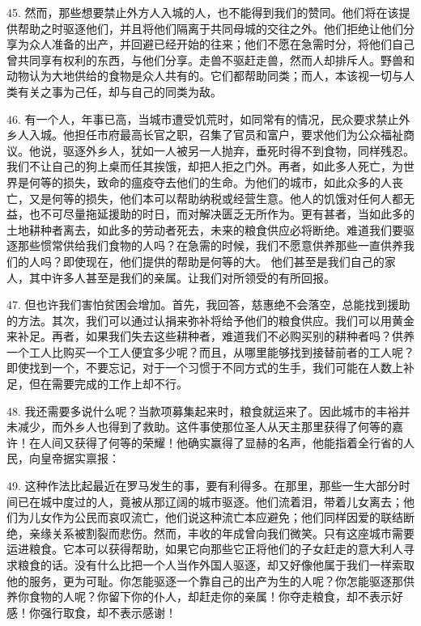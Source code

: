 \par

45. 然而，那些想要禁止外方人入城的人，也不能得到我们的赞同。他们将在该提供帮助之时驱逐他们，并且将他们隔离于共同母城的交往之外。他们拒绝让他们分享为众人准备的出产，并回避已经开始的往来；他们不愿在急需时分，将他们自己曾共同享有权利的东西，与他们分享。走兽不驱赶走兽，然而人却排斥人。野兽和动物认为大地供给的食物是众人共有的。它们都帮助同类；而人，本该视一切与人类有关之事为己任，却与自己的同类为敌。\par

46. 有一个人，年事已高，当城市遭受饥荒时，如同常有的情况，民众要求禁止外乡人入城。他担任市府最高长官之职，召集了官员和富户，要求他们为公众福祉商议。他说，驱逐外乡人，犹如一人被另一人抛弃，垂死时得不到食物，同样残忍。我们不让自己的狗上桌而任其挨饿，却把人拒之门外。再者，如此多人死亡，为世界是何等的损失，致命的瘟疫夺去他们的生命。为他们的城市，如此众多的人丧亡，又是何等的损失，他们本可以帮助纳税或经营生意。他人的饥饿对任何人都无益，也不可尽量拖延援助的时日，而对解决匮乏无所作为。更有甚者，当如此多的土地耕种者离去，如此多的劳动者死去，未来的粮食供应必将断绝。难道我们要驱逐那些惯常供给我们食物的人吗？在急需的时候，我们不愿意供养那些一直供养我们的人吗？即使现在，他们提供的帮助是何等的大。 他们甚至是我们自己的家人，其中许多人甚至是我们的亲属。让我们对所领受的有所回报。\par

47. 但也许我们害怕贫困会增加。首先，我回答，慈惠绝不会落空，总能找到援助的方法。其次，我们可以通过认捐来弥补将给予他们的粮食供应。我们可以用黄金来补足。再者，如果我们失去这些耕种者，难道我们不必购买别的耕种者吗？供养一个工人比购买一个工人便宜多少呢？而且，从哪里能够找到接替前者的工人呢？即使找到一个，不要忘记，对于一个习惯于不同方式的生手，我们可能在人数上补足，但在需要完成的工作上却不行。\par

48. 我还需要多说什么呢？当款项募集起来时，粮食就运来了。因此城市的丰裕并未减少，而外乡人也得到了救助。这件事使那位圣人从天主那里获得了何等的嘉许！在人间又获得了何等的荣耀！他确实赢得了显赫的名声，他能指着全行省的人民，向皇帝据实禀报：\par

49. 这种作法比起最近在罗马发生的事，要有利得多。在那里，那些一生大部分时间已在城中度过的人，竟被从那辽阔的城市驱逐。他们流着泪，带着儿女离去；他们为儿女作为公民而哀叹流亡，他们说这种流亡本应避免；他们同样因爱的联结断绝，亲缘关系被割裂而悲伤。然而，丰收的年成曾向我们微笑。只有这座城市需要运进粮食。它本可以获得帮助，如果它向那些它正将他们的子女赶走的意大利人寻求粮食的话。没有什么比把一个人当作外国人驱逐，却又好像他属于我们一样索取他的服务，更为可耻。你怎能驱逐一个靠自己的出产为生的人呢？你怎能驱逐那供养你食物的人呢？你留下你的仆人，却赶走你的亲属！你夺走粮食，却不表示好感！你强行取食，却不表示感谢！\par

